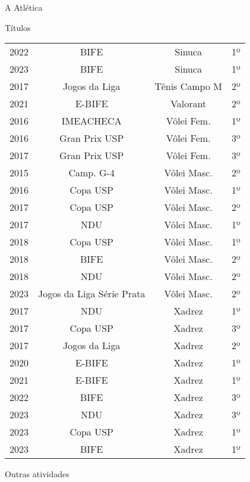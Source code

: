 \begin{secao}{A Atlética}
\begin{subsecao}{Títulos}
\begin{center}
\begin{tabular}{|c|c|c|c|}
    2022 & BIFE           & Sinuca          & 1º\\
    2023 & BIFE           & Sinuca          & 1º\\
    2017 & Jogos da Liga  & Tênis Campo M   & 2º\\
    2021 & E-BIFE         & Valorant        & 2º\\
    2016 & IMEACHECA      & Vôlei Fem.      & 1º\\
    2016 & Gran Prix USP  & Vôlei Fem.      & 3º\\
    2017 & Gran Prix USP  & Vôlei Fem.      & 3º\\
    2015 & Camp. G-4      & Vôlei Masc.     & 2º\\
    2016 & Copa USP       & Vôlei Masc.     & 1º\\
    2017 & Copa USP       & Vôlei Masc.     & 2º\\
    2017 & NDU            & Vôlei Masc.     & 1º\\
    2018 & Copa USP       & Vôlei Masc.     & 1º\\
    2018 & BIFE           & Vôlei Masc.     & 2º\\
    2018 & NDU            & Vôlei Masc.     & 2º\\
    2023 & Jogos da Liga Série Prata & Vôlei Masc. & 2º\\
    2017 & NDU            & Xadrez          & 1º\\
    2017 & Copa USP       & Xadrez          & 3º\\
    2017 & Jogos da Liga  & Xadrez          & 2º\\
    2020 & E-BIFE         & Xadrez          & 1º\\
    2021 & E-BIFE         & Xadrez          & 1º\\
    2022 & BIFE           & Xadrez          & 3º\\
    2023 & NDU            & Xadrez          & 3º\\
    2023 & Copa USP       & Xadrez          & 1º\\
    2023 & BIFE           & Xadrez          & 1º\\
    \hline
  \end{tabular}
\end{center}

\end{subsecao}
\begin{subsecao}{Outras atividades}


\end{subsecao}
\end{secao}
